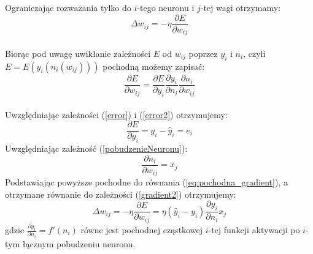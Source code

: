 \documentclass[a4paper, openright, twoside,11pt]{article}
\begin{document}
    Ograniczając rozważania tylko do $i$-tego neuronu i $j$-tej wagi otrzymamy:\\
    \begin{equation} \label{gradient2}
    \Delta  w_{ij} = - \eta \frac{\partial E}{\partial w_{ij}}
    \end{equation}\\[0.3cm]
    Biorąc pod uwagę uwikłanie zależności $E$ od $w_{ij}$ poprzez $y_i$ i $n_i$, czyli $E = E(y_i(n_i(w_{ij})))$ pochodną możemy zapisać:\\
    \begin{equation}
    \label{eq:pochodna_gradient}
    \frac{\partial E}{\partial w_{ij}} = \frac{\partial E}{\partial y_i}  \frac{\partial y_i}{\partial n_i}  \frac{\partial n_i}{\partial w_{ij}}
    \end{equation}\\
    Uwzględniając zależności (\ref{error}) i (\ref{error2}) otrzymujemy:
    \begin{equation}
    \frac{\partial E}{\partial y_i} = y_i - \hat{y}_i = e_i
    \end{equation}
    Uwzględniając zależność (\ref{pobudzenieNeuronu}):
    \begin{equation}
    \frac{\partial n_i}{\partial w_{ij}} = x_j
    \end{equation}
    Podstawiając powyższe pochodne do równania (\ref{eq:pochodna_gradient}), a otrzymane równanie do zależności (\ref{gradient2}) otrzymujemy:
    \begin{equation}
        \label{gradient_podstawione}
        \Delta  w_{ij} = - \eta \frac{\partial E}{\partial w_{ij}} = \eta (\hat{y}_i - y_i) \frac{\partial y_i}{\partial n_i} x_j
    \end{equation}
    gdzie
    $\frac{\partial y_i}{\partial n_i} = f'(n_i)$ równe jest pochodnej cząstkowej $i$-tej funkcji aktywacji po $i$-tym łącznym pobudzeniu neuronu.
    
    
\end{document}
